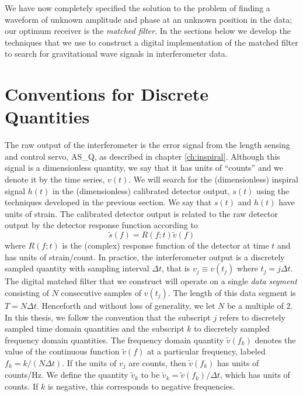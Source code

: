 We have now completely specified the solution to the problem of finding a
waveform of unknown amplitude and phase at an unknown position in the data;
our optimum receiver is the \emph{matched filter}. In the sections below we
develop the techniques that we use to construct a digital implementation of
the matched filter to search for gravitational wave signals in interferometer
data.

\section{Conventions for Discrete Quantities}
\label{s:conventions}

The raw output of the interferometer is the error signal from the length
sensing and control servo, AS\_Q, as described in chapter \ref{ch:inspiral}.
Although this signal is a dimensionless quantity, we say that it has units of
``counts'' and we denote it by the time series, $v(t)$.  We will search for
the (dimensionless) inspiral signal $h(t)$ in the (dimensionless) calibrated
detector output, $s(t)$ using the techniques developed in the previous
section. We say that $s(t)$ and $h(t)$ have units of strain. The calibrated
detector output is related to the raw detector output by the detector response
function according
to \begin{equation}
\tilde{s}(f) = R(f;t) \tilde{v}(f)
\end{equation}
where $R(f;t)$ is the (complex) response function of the detector at time
$t$\cite{Adhikari:2003} and has units of strain/count.  In practice, the
interferometer output is a discretely sampled quantity with sampling interval
$\Delta t$, that is $v_j \equiv v(t_j)$ where $t_j = j\Delta t$.  The digital
matched filter that we construct will operate on a single \emph{data segment}
consisting of $N$ consecutive samples of $v(t_j)$. The length of this data
segment is $T = N\Delta t$.  Henceforth and without loss of generality, we let
$N$ be a multiple of $2$.  In this thesis, we follow the convention that the
subscript $j$ refers to discretely sampled time domain quantities and the
subscript $k$ to discretely sampled frequency domain quantities.  The
frequency domain quantity $\tilde{v}(f_k)$ denotes the value of the continuous
function $\tilde{v}(f)$ at a particular frequency, labeled $f_k = k/(N\Delta
t)$. If the units of $v_j$ are counts, then $\tilde{v}(f_k)$ has units of
counts/Hz. We define the quantity $\tilde{v}_k$ to be $\tilde{v}_k =
\tilde{v}(f_k) / \Delta t$, which has units of counts. If $k$ is negative,
this corresponds to negative frequencies.

